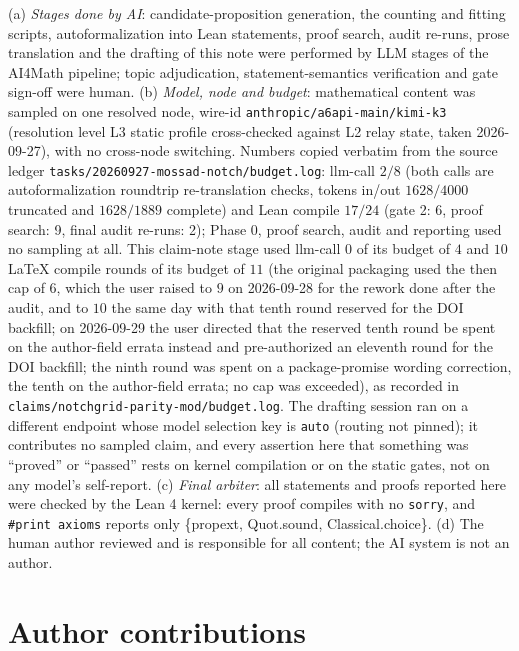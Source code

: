 \documentclass[11pt]{article}
\begin{document}
(a) \emph{Stages done by AI}: candidate-proposition generation, the counting and
fitting scripts, autoformalization into Lean statements, proof search, audit
re-runs, prose translation and the drafting of this note were performed by LLM
stages of the AI4Math pipeline; topic adjudication, statement-semantics
verification and gate sign-off were human. (b) \emph{Model, node and budget}:
mathematical content was sampled on one resolved node, wire-id
\texttt{anthropic/}\allowbreak\texttt{a6api-main/}\allowbreak\texttt{kimi-k3}
(resolution level L3 static profile cross-checked against L2 relay state, taken
2026-09-27), with no cross-node switching. Numbers copied verbatim from the
source ledger \texttt{tasks/20260927-mossad-notch/}\allowbreak\texttt{budget.log}:
llm-call $2/8$ (both calls are autoformalization roundtrip
re-translation checks, tokens in/out $1628/4000$ truncated and $1628/1889$
complete) and Lean compile $17/24$ (gate 2: 6, proof search: 9, final audit
re-runs: 2); Phase 0, proof search, audit and reporting used no sampling at all.
This claim-note stage used llm-call $0$ of its budget of $4$ and $10$ LaTeX
compile rounds of its budget of $11$ (the original packaging used the then cap of
$6$, which the user raised to $9$ on 2026-09-28 for the rework done after the
audit, and to $10$ the same day with that tenth round reserved for the DOI
backfill; on 2026-09-29 the user directed that the reserved tenth round be spent
on the author-field errata instead and pre-authorized an eleventh round for the
DOI backfill; the ninth round was spent on a package-promise wording correction,
the tenth on the author-field errata; no cap was exceeded), as recorded in
\texttt{claims/notchgrid-parity-mod/budget.log}. The drafting session ran on a
different endpoint whose model selection key is \texttt{auto} (routing not
pinned); it contributes no sampled claim, and every assertion here that something
was ``proved'' or ``passed'' rests on kernel compilation or on the static gates,
not on any model's self-report. (c) \emph{Final arbiter}: all statements and
proofs reported here were checked by the Lean 4 kernel: every proof compiles with
no \texttt{sorry}, and \texttt{\#print axioms} reports only \{propext, Quot.sound,
Classical.choice\}. (d) The human author reviewed and is responsible for all
content; the AI system is not an author.

\section*{Author contributions}
\end{document}
